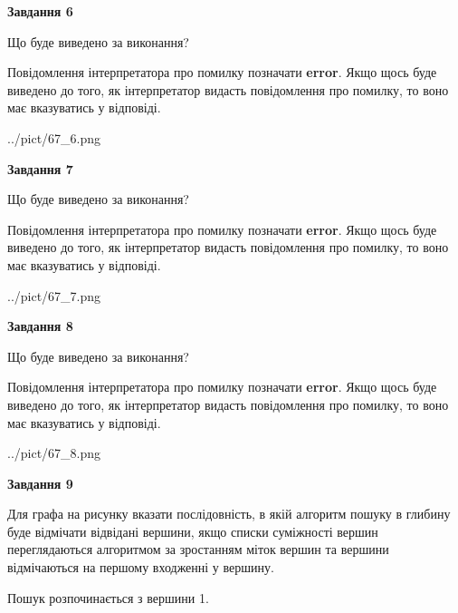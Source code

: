 \documentclass[12pt, ukrainian]{article}
\begin{document}
{\begin {large}
{\begin {center}\textbf{Завдання 6}\end {center}}\par
Що буде виведено за виконання?

Повідомлення інтерпретатора про помилку позначати \textbf{error}.
Якщо щось буде виведено до того, як інтерпретатор видасть повідомлення про помилку, 
то воно має вказуватись у відповіді. \par


\begin{center}
	{../pict/67_6.png}
\end{center}
\newpage

{\begin {center}\textbf{Завдання 7}\end {center}}\par
Що буде виведено за виконання?

Повідомлення інтерпретатора про помилку позначати \textbf{error}.
Якщо щось буде виведено до того, як інтерпретатор видасть повідомлення про помилку, 
то воно має вказуватись у відповіді. \par


\begin{center}
	{../pict/67_7.png}
\end{center}
\newpage

{\begin {center}\textbf{Завдання 8}\end {center}}\par
Що буде виведено за виконання?

Повідомлення інтерпретатора про помилку позначати \textbf{error}.
Якщо щось буде виведено до того, як інтерпретатор видасть повідомлення про помилку, 
то воно має вказуватись у відповіді. \par


\begin{center}
	{../pict/67_8.png}
\end{center}
\newpage

{\begin {center}\textbf{Завдання 9}\end {center}}\par
Для графа на рисунку вказати послідовність, в якій алгоритм пошуку в глибину буде відмічати відвідані вершини, якщо списки суміжності вершин переглядаються алгоритмом за зростанням міток вершин та вершини відмічаються на першому вход\-женні у вершину.\par
Пошук розпочинається з вершини 1.\par


\end{large}}
\end{document}
